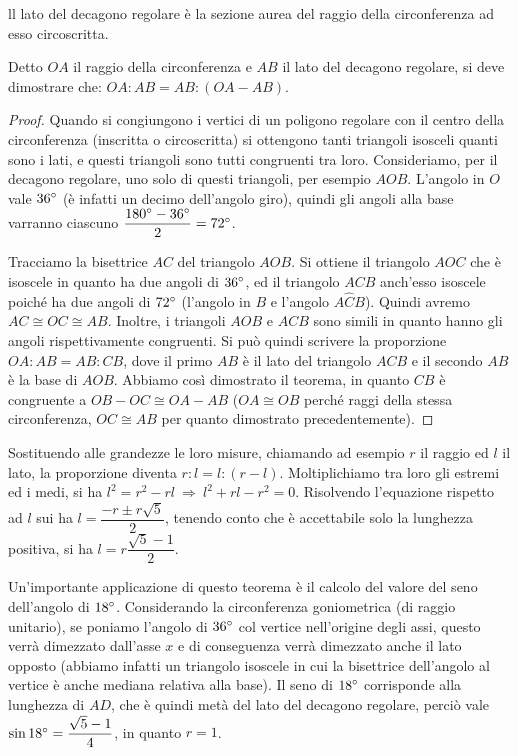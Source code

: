\begin{teorema}
ll lato del decagono regolare è la sezione aurea del raggio della circonferenza ad esso circoscritta.
\end{teorema}

Detto $OA$ il raggio della circonferenza e $AB$ il lato del decagono regolare, si deve dimostrare che: $OA:AB=AB:(OA-AB)$.

\begin{proof}
Quando si congiungono i vertici di un poligono regolare con il centro della circonferenza (inscritta o circoscritta) si ottengono tanti triangoli isosceli quanti sono i lati, e questi triangoli sono tutti congruenti tra loro.
Consideriamo, per il decagono regolare, uno solo di questi triangoli, per esempio $AOB$. L'angolo in $O$ vale $36{}^{\circ}$ (è infatti un decimo dell'angolo giro), quindi gli angoli alla base varranno ciascuno $\dfrac{180{}^{\circ}-36{}^{\circ}}{2} = 72{}^{\circ}$.

Tracciamo la bisettrice $AC$ del triangolo $AOB$. Si ottiene il triangolo $AOC$ che è isoscele in quanto ha due angoli di $36{}^{\circ}$, ed il triangolo $ACB$ anch'esso isoscele poiché ha due angoli di $72{}^{\circ}$ (l'angolo in $B$ e l'angolo $A\widehat{C}B$).  
Quindi avremo $AC\cong OC\cong AB$.
Inoltre, i triangoli $AOB$ e $ACB$ sono simili in quanto hanno gli angoli rispettivamente congruenti.
Si può quindi scrivere la proporzione $OA:AB=AB:CB$, dove il primo $AB$ è il lato del triangolo $ACB$ e il secondo $AB$ è la base di $AOB$.
Abbiamo così dimostrato il teorema, in quanto $CB$ è congruente a $OB-OC \cong OA-AB$ ($OA\cong OB$ perché raggi della stessa circonferenza, $OC\cong AB$ per quanto dimostrato precedentemente).
\end{proof}

Sostituendo alle grandezze le loro misure, chiamando ad esempio $r$ il raggio ed $l$ il lato, la proporzione diventa $r:l=l:(r-l)$.
Moltiplichiamo tra loro gli estremi ed i medi, si ha $l^2=r^2-rl \:\Rightarrow\: l^2+rl-r^2=0$.
Risolvendo l'equazione rispetto ad $l$ sui ha $l=\dfrac{-r\pm r\sqrt{5}}{2}$, tenendo conto che è accettabile solo la lunghezza positiva, si ha $l=r\dfrac{\sqrt{5}-1}{2}$.

Un'importante applicazione di questo teorema è il calcolo del valore del seno dell'angolo di $18{}^{\circ}$.
Considerando la circonferenza goniometrica (di raggio unitario), se poniamo l'angolo di $36{}^{\circ}$ col vertice nell'origine degli assi, questo verrà dimezzato dall'asse $x$ e di conseguenza verrà dimezzato anche il lato opposto (abbiamo infatti un triangolo isoscele in cui la bisettrice dell'angolo al vertice è anche mediana relativa alla base).
Il seno di $18{}^{\circ}$ corrisponde alla lunghezza di $AD$, che è quindi metà del lato del decagono regolare, perciò vale $\sin 18{}^{\circ} = \dfrac{\sqrt{5}-1}{4}$, in quanto $r = 1$.

\newpage

\begin{comment}



\cleardoublepage

\end{comment}
